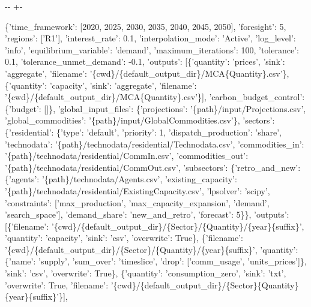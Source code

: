 \documentclass[letterpaper,10pt,english]{sphinxmanual}
\newlength\nbsphinxcodecellspacing
\begin{document}
{

\kern-\sphinxverbatimsmallskipamount\kern-\baselineskip
\kern+\FrameHeightAdjust\kern-\fboxrule
\vspace{\nbsphinxcodecellspacing}

\begin{sphinxVerbatim}[commandchars=\\\{\}]
\llap{\color{nbsphinxout}[3]:\,\hspace{\fboxrule}\hspace{\fboxsep}}\{'time\_framework': [2020, 2025, 2030, 2035, 2040, 2045, 2050],
 'foresight': 5,
 'regions': ['R1'],
 'interest\_rate': 0.1,
 'interpolation\_mode': 'Active',
 'log\_level': 'info',
 'equilibrium\_variable': 'demand',
 'maximum\_iterations': 100,
 'tolerance': 0.1,
 'tolerance\_unmet\_demand': -0.1,
 'outputs': [\{'quantity': 'prices',
   'sink': 'aggregate',
   'filename': '\{cwd\}/\{default\_output\_dir\}/MCA\{Quantity\}.csv'\},
  \{'quantity': 'capacity',
   'sink': 'aggregate',
   'filename': '\{cwd\}/\{default\_output\_dir\}/MCA\{Quantity\}.csv'\}],
 'carbon\_budget\_control': \{'budget': []\},
 'global\_input\_files': \{'projections': '\{path\}/input/Projections.csv',
  'global\_commodities': '\{path\}/input/GlobalCommodities.csv'\},
 'sectors': \{'residential': \{'type': 'default',
   'priority': 1,
   'dispatch\_production': 'share',
   'technodata': '\{path\}/technodata/residential/Technodata.csv',
   'commodities\_in': '\{path\}/technodata/residential/CommIn.csv',
   'commodities\_out': '\{path\}/technodata/residential/CommOut.csv',
   'subsectors': \{'retro\_and\_new': \{'agents': '\{path\}/technodata/Agents.csv',
     'existing\_capacity': '\{path\}/technodata/residential/ExistingCapacity.csv',
     'lpsolver': 'scipy',
     'constraints': ['max\_production',
      'max\_capacity\_expansion',
      'demand',
      'search\_space'],
     'demand\_share': 'new\_and\_retro',
     'forecast': 5\}\},
   'outputs': [\{'filename': '\{cwd\}/\{default\_output\_dir\}/\{Sector\}/\{Quantity\}/\{year\}\{suffix\}',
     'quantity': 'capacity',
     'sink': 'csv',
     'overwrite': True\},
    \{'filename': '\{cwd\}/\{default\_output\_dir\}/\{Sector\}/\{Quantity\}/\{year\}\{suffix\}',
     'quantity': \{'name': 'supply',
      'sum\_over': 'timeslice',
      'drop': ['comm\_usage', 'units\_prices']\},
     'sink': 'csv',
     'overwrite': True\},
    \{'quantity': 'consumption\_zero',
     'sink': 'txt',
     'overwrite': True,
     'filename': '\{cwd\}/\{default\_output\_dir\}/\{Sector\}\{Quantity\}\{year\}\{suffix\}'\}],

\end{sphinxVerbatim}}
\end{document}
